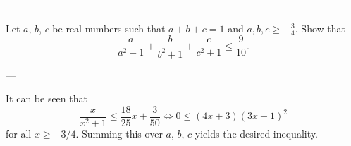 
---

Let $a$, $b$, $c$ be real numbers such that $a+b+c=1$ and $a,b,c\ge-\frac34$. Show that \[\frac a{a^2+1}+\frac b{b^2+1}+\frac c{c^2+1}\le\frac9{10}.\]

---

It can be seen that \[\frac x{x^2+1}\le\frac{18}{25}x+\frac3{50}\iff0\le(4x+3)(3x-1)^2\]
for all $x\ge-3/4$. Summing this over $a$, $b$, $c$ yields the desired inequality.
